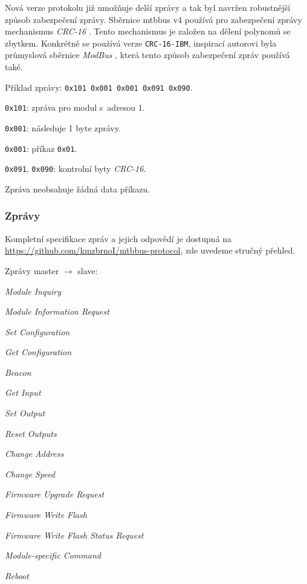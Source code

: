 \begin{enumerate}
Nová verze protokolu již umožňuje delší zprávy a tak byl navržen robustnější
způsob zabezpečení zprávy. Sběrnice \gls{mtbbus} v4 používá pro zabezpečení
zprávy mechanismus \textit{CRC-16} \cite{crc16-modbus}. Tento mechanismus je
založen na dělení polynomů se zbytkem. Konkrétně se používá verze
\texttt{CRC-16-IBM}, inspirací autorovi byla průmyslová sběrnice \textit{ModBus}
\cite{modbus}, která tento způsob zabezpečení zpráv používá také.

\end{enumerate}

Příklad zprávy: \texttt{0x101 0x001 0x001 0x091 0x090}.

\begin{compactenum}
\item \texttt{0x101}: zpráva pro modul s~adresou 1.
\item \texttt{0x001}: následuje 1 byte zprávy.
\item \texttt{0x001}: příkaz \texttt{0x01}.
\item \texttt{0x091}, \texttt{0x090}: kontrolní byty \textit{CRC-16}.
\end{compactenum}

Zpráva neobsahuje žádná data příkazu.

\subsubsection{Zprávy} \label{subsub:mtbbus-messages}

Kompletní specifikace zpráv a jejich odpovědí je dostupná na
\url{https://github.com/kmzbrnoI/mtbbus-protocol}, zde uvedeme stručný přehled.

Zprávy master $\rightarrow$ slave:

\begin{compactitem}
\item \textit{Module Inquiry}
\item \textit{Module Information Request}
\item \textit{Set Configuration}
\item \textit{Get Configuration}
\item \textit{Beacon}
\item \textit{Get Input}
\item \textit{Set Output}
\item \textit{Reset Outputs}
\item \textit{Change Address}
\item \textit{Change Speed}
\item \textit{Firmware Upgrade Request}
\item \textit{Firmware Write Flash}
\item \textit{Firmware Write Flash Status Request}
\item \textit{Module-specific Command}
\item \textit{Reboot}

\end{compactitem}

